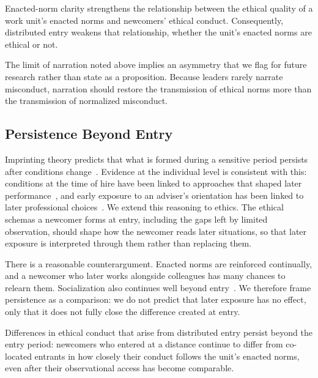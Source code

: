 \begin{proposition}
Enacted-norm clarity strengthens the relationship between the ethical quality of a work unit's enacted norms and newcomers' ethical conduct. Consequently, distributed entry weakens that relationship, whether the unit's enacted norms are ethical or not.
\end{proposition}

The limit of narration noted above implies an asymmetry that we flag for future research rather than state as a proposition. Because leaders rarely narrate misconduct, narration should restore the transmission of ethical norms more than the transmission of normalized misconduct.

\subsection{Persistence Beyond Entry}

Imprinting theory predicts that what is formed during a sensitive period persists after conditions change~\citep{marquis2013imprinting}. Evidence at the individual level is consistent with this: conditions at the time of hire have been linked to approaches that shaped later performance~\citep{tilcsik2014imprint}, and early exposure to an adviser's orientation has been linked to later professional choices~\citep{azoulay2017social}. We extend this reasoning to ethics. The ethical schemas a newcomer forms at entry, including the gaps left by limited observation, should shape how the newcomer reads later situations, so that later exposure is interpreted through them rather than replacing them.

There is a reasonable counterargument. Enacted norms are reinforced continually, and a newcomer who later works alongside colleagues has many chances to relearn them. Socialization also continues well beyond entry~\citep{vanmaanen1979toward}. We therefore frame persistence as a comparison: we do not predict that later exposure has no effect, only that it does not fully close the difference created at entry.

\begin{proposition}
Differences in ethical conduct that arise from distributed entry persist beyond the entry period: newcomers who entered at a distance continue to differ from co-located entrants in how closely their conduct follows the unit's enacted norms, even after their observational access has become comparable.
\end{proposition}

